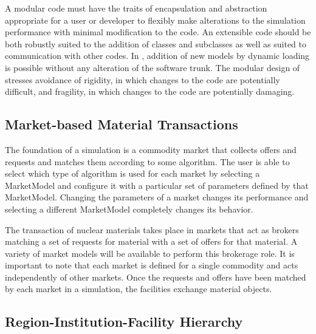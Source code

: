 A modular code must have the traits of encapsulation and abstraction 
appropriate for a user or developer to flexibly make alterations to 
the simulation performance with minimal modification to the code. An 
extensible code should be both robustly suited to the addition of 
classes and subclasses as well as suited to communication with other codes.
In \Cyclus, addition of new models by dynamic loading is possible without 
any alteration of the software trunk. The modular design of \Cyclus stresses
avoidance of rigidity, in which changes to the code are potentially difficult, 
and fragility, in which changes to the code are potentially damaging.

\subsection{Market-based Material Transactions}

The foundation of a simulation is a commodity market that collects 
offers and requests and matches them according to some algorithm.  The 
user is able to select which type of algorithm is used for each market 
by selecting a MarketModel and configure it with a particular set of 
parameters defined by that MarketModel.  Changing the parameters of a 
market changes its performance and selecting a different MarketModel 
completely changes its behavior.

The transaction of nuclear materials takes place in markets that act
as brokers matching a set of requests for material with a set of
offers for that material. A variety of market models will be available
to perform this brokerage role. It is important to note that each
market is defined for a single commodity and acts independently of
other markets. Once the requests and offers have been matched by each
market in a simulation, the facilities exchange material objects.

\subsection{Region-Institution-Facility Hierarchy}

